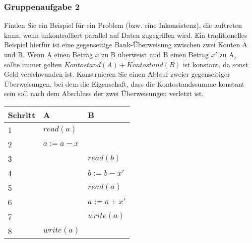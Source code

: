 \begin{frame}
    \frametitle{Gruppenaufgabe 2}
    \vspace{0.5cm}

    Finden Sie ein Beispiel für ein Problem (bzw. eine Inkonsistenz), 
    die auftreten kann, wenn unkontrolliert parallel auf Daten zugegriffen wird. 
    Ein traditionelles Beispiel hierfür ist eine gegenseitige Bank-Überweisung zwischen zwei 
    Konten A und B. Wenn A einen Betrag \( x \) zu B überweist und B einen Betrag \( x' \) 
    zu A, sollte immer gelten \( Kontostand(A) + Kontostand(B) \) ist konstant, 
    da sonst Geld verschwunden ist. 
    Konstruieren Sie einen Ablauf zweier gegenseitiger Überweisungen, 
    bei dem die Eigenschaft, dass die Kontostandssumme konstant sein soll nach dem 
    Abschluss der zwei Überweisungen verletzt ist.

    \pause
    \begin{table}[]
        \begin{tabular}{l|l|l}
         Schritt & A & B \\ \hline
        1 & \( read(a) \) &  \\
        2 & \( a := a - x \) &  \\
        3 &  & \( read(b) \) \\
        4 &  & \( b := b - x' \) \\
        5 &  & \( read(a) \) \\
        6 &  & \( a := a + x' \) \\
        7 &  & \( write(a) \) \\
        8 & \( write(a) \) &  \\
        \end{tabular}
    \end{table}
\end{frame}
